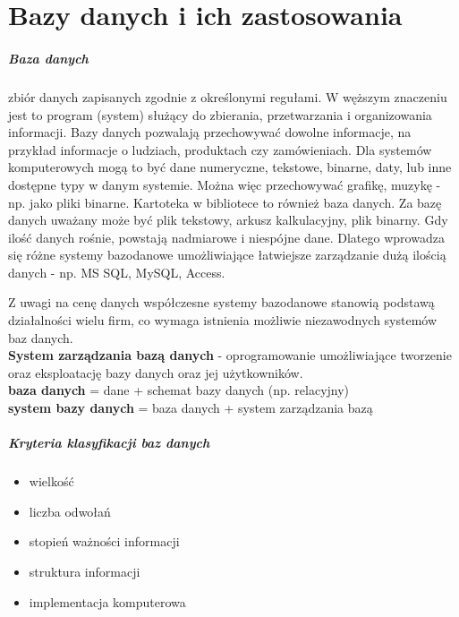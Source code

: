 \documentclass[a4paper,twoside]{report}
\begin{document}
\chapter{Bazy danych i ich zastosowania}

\paragraph{Baza danych} zbiór danych zapisanych zgodnie z określonymi regułami. W węższym znaczeniu jest to program (system) służący do zbierania, przetwarzania i organizowania informacji. 
Bazy danych pozwalają przechowywać dowolne informacje, na przykład informacje o ludziach, produktach czy zamówieniach. Dla systemów komputerowych mogą to być dane numeryczne, tekstowe, binarne, daty, lub inne dostępne typy w danym systemie. Można więc przechowywać grafikę, muzykę - np. jako pliki binarne. Kartoteka w bibliotece to również baza danych.
 Za bazę danych uważany może być plik tekstowy, arkusz kalkulacyjny, plik binarny. Gdy ilość danych rośnie, powstają nadmiarowe i niespójne dane. Dlatego wprowadza się różne systemy bazodanowe umożliwiające łatwiejsze zarządzanie dużą ilością danych - np. MS SQL, MySQL, Access.
 
Z uwagi na cenę danych współczesne systemy bazodanowe stanowią  podstawą działalności wielu firm, co wymaga istnienia możliwie niezawodnych systemów baz danych. \\
\textbf{System zarządzania bazą danych} - oprogramowanie umożliwiające tworzenie oraz eksploatację bazy danych oraz jej użytkowników. \\
\textbf{baza danych} = dane + schemat bazy danych (np. relacyjny) \\
\textbf{system bazy danych} = baza danych + system zarządzania bazą
\medskip 


\paragraph{Kryteria klasyfikacji baz danych}

\begin{itemize}
\item wielkość
\item liczba odwołań
\item stopień ważności informacji
\item struktura informacji
\item implementacja komputerowa
\end{itemize}
\end{document}
